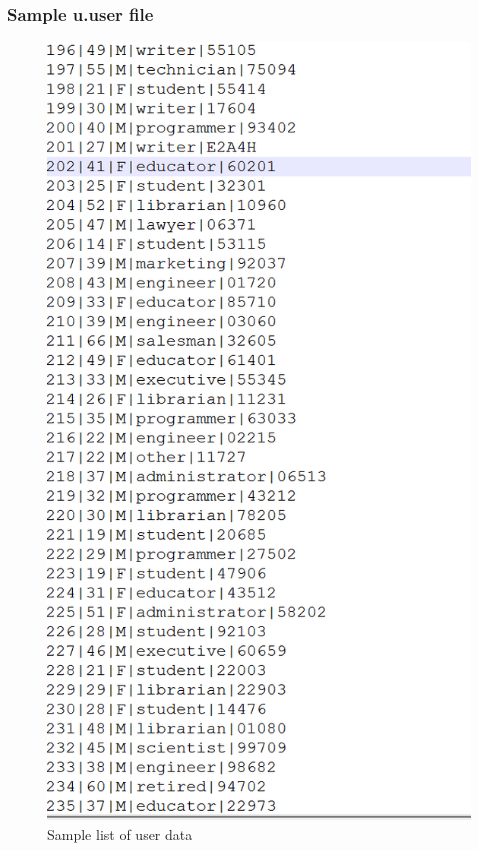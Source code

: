 \subsubsection{Sample u.user file}
\begin{figure}[ht]    
    \begin{center}
        \includegraphics[scale=0.55]{sampleuser.png}
        \caption{Sample list of user data}
        \label{Samplelist1}
    \end{center}
\end{figure}
\newpage

